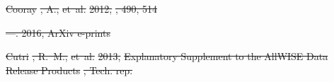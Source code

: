 \documentclass[numberedappendix]{emulateapj}
\providecommand{\DIFdel}[1]{{\protect\color{red}\sout{#1}}}                      %
\begin{document}
\DIFdel{Cooray}%
\DIFdel{, A., }%
\DIFdel{et~al.}%
\DIFdel{2012, }%
\DIFdel{, 490, 514
}%

\DIFdel{---. 2016, ArXiv e-prints
}%

\DIFdel{Cutri}%
\DIFdel{, R.~M., }%
\DIFdel{et~al.}%
\DIFdel{2013, }%
\DIFdel{Explanatory Supplement to the AllWISE Data
  Release Products}%
\DIFdel{, Tech. rep.
}%
\end{document}
